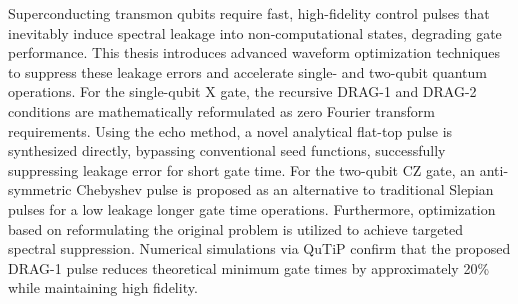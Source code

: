\begin{eabstract}
  Superconducting transmon qubits require fast, high-fidelity control pulses that inevitably induce spectral leakage
  into non-computational states, degrading gate performance. This thesis introduces advanced waveform optimization
  techniques to suppress these leakage errors and accelerate single- and two-qubit quantum operations. For the
  single-qubit X gate, the recursive DRAG-1 and DRAG-2 conditions are mathematically reformulated as zero Fourier
  transform requirements. Using the echo method, a novel analytical flat-top pulse is synthesized directly, bypassing
  conventional seed functions, successfully suppressing leakage error for short gate time.
  For the two-qubit CZ gate, an anti-symmetric
  Chebyshev pulse is proposed as an  alternative to traditional Slepian pulses for a low leakage longer gate time operations.
  Furthermore, optimization based on reformulating the original problem is utilized to achieve targeted
  spectral suppression. Numerical simulations via QuTiP confirm that the proposed DRAG-1 pulse reduces theoretical
  minimum gate times by approximately 20\% while maintaining high fidelity.



\end{eabstract}
